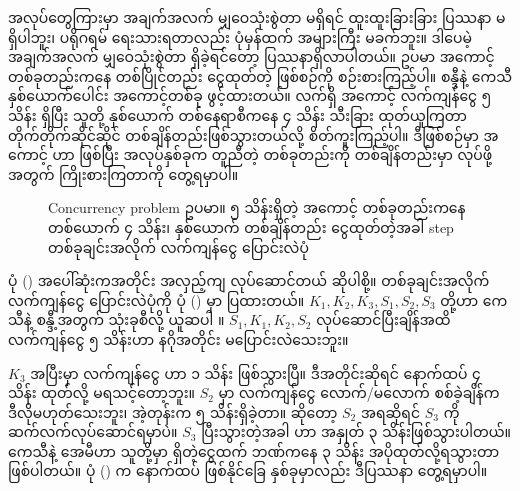  အလုပ်တွေကြားမှာ အချက်အလက် မျှဝေသုံးစွဲတာ မရှိရင် ထူးထူးခြားခြား ပြဿနာ မရှိပါဘူး၊ ပရိုဂရမ် ရေးသားရတာလည်း ပုံမှန်ထက် အများကြီး မခက်ဘူး။ ဒါပေမဲ့ အချက်အလက် မျှဝေသုံးစွဲတာ ရှိခဲ့ရင်တော့ ပြဿနာရှိလာပါတယ်။ ဥပမာ အကောင့်တစ်ခုတည်းကနေ တစ်ပြိုင်တည်း ငွေထုတ်တဲ့ ဖြစ်စဉ်ကို စဉ်းစားကြည့်ပါ။ စန္ဒီနဲ့ ကေသီ နှစ်ယောက်ပေါင်း အကောင့်တစ်ခု ဖွင့်ထားတယ်။ လက်ရှိ အကောင့် လက်ကျန်ငွေ  ၅ သိန်း ရှိပြီး သူတို့ နှစ်ယောက် တစ်နေရာစီကနေ ၄ သိန်း သီးခြား ထုတ်ယူကြတာ တိုက်တိုက်ဆိုင်ဆိုင် တစ်ချိန်တည်းဖြစ်သွားတယ်လို့ စိတ်ကူးကြည့်ပါ။ ဒီဖြစ်စဉ်မှာ အကောင့်  ဟာ  ဖြစ်ပြီး အလုပ်နှစ်ခုက တူညီတဲ့  တစ်ခုတည်းကို တစ်ချိန်တည်းမှာ  လုပ်ဖို့အတွက် ကြိုးစားကြတာကို တွေ့ရမှာပါ။


%
\begin{figure}[!htb]
    \caption{Concurrency problem ဥပမာ။ ၅ သိန်းရှိတဲ့ အကောင့် တစ်ခုတည်းကနေ တစ်ယောက် ၄ သိန်း၊ နှစ်ယောက် တစ်ချိန်တည်း ငွေထုတ်တဲ့အခါ step တစ်ခုချင်းအလိုက် လက်ကျန်ငွေ ပြောင်းလဲပုံ}
    \label{fig:accwithdrawconcur2}
\end{figure}
%

ပုံ (\fRefNo{\ref{fig:accwithdrawconcur1}}) အပေါ်ဆုံးကအတိုင်း အလှည့်ကျ လုပ်ဆောင်တယ် ဆိုပါစို့။  တစ်ခုချင်းအလိုက် လက်ကျန်ငွေ  ပြောင်းလဲပုံကို ပုံ (\fRefNo{\ref{fig:accwithdrawconcur2}}) မှာ ပြထားတယ်။ $K_1, K_2, K_3, S_1, S_2, S_3$ တို့ဟာ ကေသီနဲ့ စန္ဒီ့အတွက်  သုံးခုစီလို့ ယူဆပါ ။ $S_1, K_1, K_2, S_2$ လုပ်ဆောင်ပြီးချိန်အထိ လက်ကျန်ငွေ ၅ သိန်းဟာ နဂိုအတိုင်း မပြောင်းလဲသေးဘူး။




$K_3$ အပြီးမှာ လက်ကျန်ငွေ  ဟာ ၁ သိန်း ဖြစ်သွားပြီ။ ဒီအတိုင်းဆိုရင် နောက်\allowbreak ထပ် ၄ သိန်း ထုတ်လို့ မရသင့်တော့ဘူး။ $S_2$ မှာ လက်ကျန်ငွေ လောက်/မလောက် စစ်ခဲ့ချိန်က ဒီလိုမဟုတ်သေးဘူး၊ အဲ့တုန်းက ၅ သိန်းရှိခဲ့တာ။ ဆိုတော့ $S_2$ အရဆိုရင် $S_3$ ကို ဆက်လက်လုပ်ဆောင်ရမှာပဲ။ $S_3$ ပြီးသွားတဲ့အခါ  ဟာ အနှုတ် ၃ သိန်းဖြစ်သွားပါတယ်။ ကေသီနဲ့ အေမီဟာ သူတို့မှာ ရှိတဲ့ငွေထက် ဘဏ်ကနေ ၃ သိန်း အပိုထုတ်လို့ရသွားတာ ဖြစ်ပါတယ်။  ပုံ (\fRefNo{\ref{fig:accwithdrawconcur1}}) က နောက်ထပ် ဖြစ်နိုင်ခြေ နှစ်ခုမှာလည်း ဒီပြဿနာ တွေ့ရမှာပါ။

